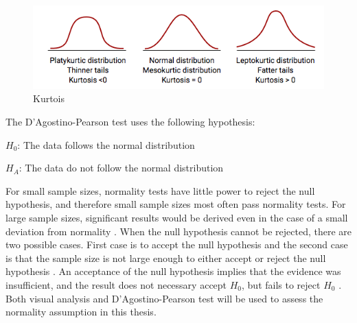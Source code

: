 \begin{figure}[h!]
	\centering
	\includegraphics[width=0.7\linewidth]{fig/kurtois}
	\caption{Kurtois \citep{MedCalcSoftwarebvba2017}}
	\label{fig:kurtois}
\end{figure}


The D'Agostino-Pearson test uses the following hypothesis:\newline

\centerline{$H_{0}$: The data follows the normal distribution} 
\centerline{$H_{A}$: The data do not follow the normal distribution}

For small sample sizes, normality tests have little power to reject the null hypothesis, and therefore small sample sizes most often pass normality tests. For large sample sizes, significant results would be derived even in the case of a small deviation from normality \citep{Pearson2006}. When the null hypothesis cannot be rejected, there are two possible cases. First case is to accept the null hypothesis and the second case is that the sample size is not large enough to either accept or reject the null hypothesis \citep{ThePennsylvaniaStateUniversity2017}. An acceptance of the null hypothesis implies that the evidence was insufficient, and the result does not necessary accept $H_{0}$, but fails to reject $H_{0}$ \citep{Walpole2012}. Both visual analysis and D'Agostino-Pearson test will be used to assess the normality assumption in this thesis. 



